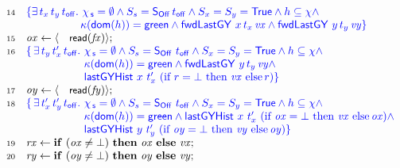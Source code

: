 \begin{figure}[!htp]
\[\begin{array}[t]{r l}
  \num{14} & \specK{\{ \exists\, t_x\, t_y\, \toff \ldot\, \histS = \hempty \wedge
             \sss = \sOff\, \toff \wedge \sx = \sy = \TT  \wedge
             h \subseteq \hist \wedge}\\
           & \specK{\hphantom{\{ \exists\, t_x \, t_y\, \toff\ldot}
             \C(\dom{h}) = \mathsf{green} \wedge    
            \botLGY\ x\, t_x\, \var{vx} \wedge \botLGY\ y\, t_y\, \var{vy}\}} \\
  \num{15} & \var{ox} \tbnd \lat \act{read}(\var{\fx}) \rat;\\
  \num{16} & \specK{\{\, \exists\, t_y\, t'_x\, \toff \ldot\,
              \histS = \hempty \wedge
              \sss = \sOff\ \toff \wedge \sx = \sy = \TT \wedge
              h \subseteq \hist \wedge}\\
           & \specK{\hphantom{\{\, \exists\, t_y\, t'_x\, \toff \ldot}\,
              \C(\dom{h}) = \mathsf{green} \wedge
              \botLGY\ y\, t_y\, \var{vy} \wedge}\\
           & \specK{\hphantom{\{\, \exists\, t_y\, t'_x\, \toff \ldot}\,
              \histLGY\ x\ t'_x\ (\textrm{if}\ r = \bot\
                   \textrm{then}\ \var{vx}\ \textrm{else}\, r)\}}\\
  \num{17} & \var{oy} \tbnd \lat \act{read}(\var{\fy}) \rat;\\
  \num{18} & \specK{\{\, \exists\, t'_x\, t'_y\, \toff \ldot\,
              \histS = \hempty \wedge
              \sss = \sOff\ \toff \wedge \sx = \sy = \TT \wedge
              h \subseteq \hist \wedge}\\
             & \specK{\hphantom{\{\,
                  \exists\, t'_x\, t'_y\, \toff \ldot}\,
              \C(\dom{h}) = \mathsf{green} \wedge
              \histLGY\ x\ t'_x\
                      (\textrm{if}\ \var{ox} = \bot\
                       \textrm{then}\ \var{vx}\
                       \textrm{else}\, \var{ox}) \wedge}\\
             & \specK{\hphantom{\{\,
                  \exists\, t'_x\, t'_y\, \toff \ldot}\,
                 \histLGY\ y\ t'_y\
                       (\textrm{if}\ \var{oy} = \bot\
                        \textrm{then}\ \var{vy}\ \textrm{else}\, \var{oy})\}}\\
  \num{19} & \var{rx} \tbnd \kw{if}\ (\var{ox} \neq\bot)\
                \kw{then}\ \var{ox}\ \kw{else}\ \var{vx};\\
  \num{20} & \var{ry} \tbnd \kw{if}\ (\var{oy} \neq\bot)\
                 \kw{then}\ \var{oy}\ \kw{else}\ \var{vy};\\

\end{array}\]
\end{figure}
